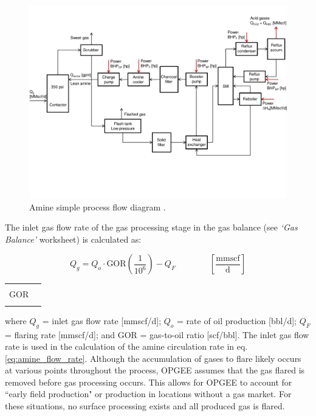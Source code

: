 \documentclass[11pt]{report}
\newcommand{\xlname}[1]{\raisebox{1pt}{\fcolorbox{light-gray}{light-gray}{\texttt{\textcolor{stanford}{\scriptsize{#1}}}}}}
\newcommand{\sheet}[1]{\textit{`{#1}'}}
\newcommand{\eqnunitfrac}[2]{\quad\quad \scriptstyle{\left[\frac{\text{#1}}{\text{#2}}\right]}}
\begin{document}
\begin{landscape}
\begin{figure}[t]
\includegraphics[width=0.85\columnwidth]{images/Amine_process.pdf}
\caption{Amine simple process flow diagram \cite[p. 112]{Manning1991}.}
\label{fig:amine_process}
\end{figure}
\end{landscape}
   

The inlet gas flow rate of the gas processing stage in the gas balance (see \sheet{Gas Balance} worksheet) is calculated as:

\begin{minipage}{0.8\columnwidth}\label{eq:AGR_inlet_gas}
\begin{fleqn}[0pt]
\begin{equation}
Q_{g}= Q_{o} \cdot \text{GOR}  \left( \frac{1}{10^6} \right) - Q_{F} \quad\quad\eqnunitfrac{mmscf}{d}
\end{equation}
\end{fleqn}
\end{minipage}\hfill
\begin{minipage}{0.3\columnwidth}
        \begin{tabular}{|cl}
        & \\
        GOR   & \xlname{GOR}\\
        & \\
        \end{tabular}
\end{minipage}
where $Q_{g}$ = inlet gas flow rate [mmscf/d]; $Q_{o}$ = rate of oil production [bbl/d]; $Q_{F}$ = flaring rate [mmscf/d]; and GOR = gas-to-oil ratio [scf/bbl]. The inlet gas flow rate is used in the calculation of the amine circulation rate in eq.\,\eqref{eq:amine_flow_rate}. Although the accumulation of gases to flare likely occurs at various points throughout the process, OPGEE assumes that the gas flared is removed before gas processing occurs. This allows for OPGEE to account for ``early field production" or production in locations without a gas market. For these situations, no surface processing exists and all produced gas is flared.  
\end{document}
